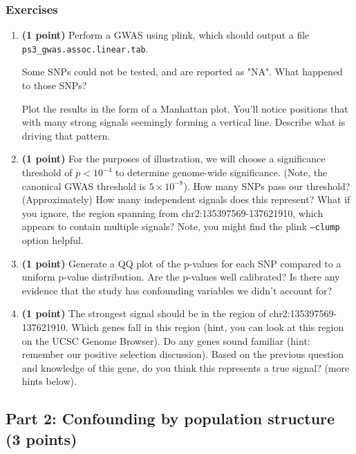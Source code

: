 \documentclass[12pt]{article}
\begin{document}
\subsubsection*{Exercises}
\begin{enumerate}
\item \textbf{(1 point)} Perform a GWAS using plink, which should output a file \texttt{ps3\_gwas.assoc.linear.tab}. 

Some SNPs could not be tested, and are reported as "NA". What happened to those SNPs?

Plot the results in the form of a Manhattan plot. You'll notice positions that with many strong signals seemingly forming a vertical line. Describe what is driving that pattern.

\item \textbf{(1 point)} 
For the purposes of illustration, we will choose a significance threshold of $p<10^{-4}$ to determine genome-wide significance. (Note, the canonical GWAS threshold is $5 \times 10^{-8}$). How many SNPs pass our threshold? (Approximately) How many independent signals does this represent? What if you ignore, the region spanning from chr2:135397569-137621910, which appears to contain multiple signals? Note, you might find the plink \texttt{--clump} option helpful.

\item \textbf{(1 point)} Generate a QQ plot of the p-values for each SNP compared to a uniform p-value distribution. Are the p-values well calibrated? Is there any evidence that the study has confounding variables we didn't account for?

\item \textbf{(1 point)} The strongest signal should be in the region of chr2:135397569-137621910. Which genes fall in this region (hint, you can look at this region on the UCSC Genome Browser). Do any genes sound familiar (hint: remember our positive selection discussion). Based on the previous question and knowledge of this gene, do you think this represents a true signal? (more hints below).

\end{enumerate}

\subsection*{Part 2: Confounding by population structure (3 points)}
\end{document}
